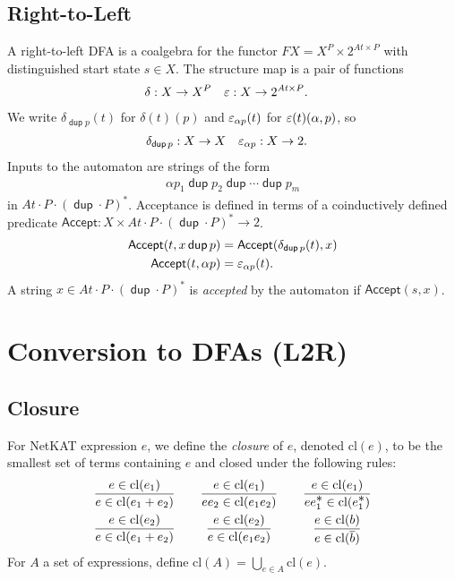 \documentclass{article}
\newcommand\At{\ensuremath{\mathit{At}}}
\newcommand\pdup{\mathop{\mathsf{dup}}}
\renewcommand\star{^{\textstyle *}}
\newcommand\acc{\mathsf{Accept}}
\newcommand\clname{\mathrm{cl}}
\newcommand\cl[1]{\clname(#1)}
\begin{document}
\subsection*{Right-to-Left}

A right-to-left DFA is a coalgebra for the functor $FX = X^{P}\times 2^{\At\times P}$ with distinguished start state $s\in X$. The structure map is a pair of functions
\begin{align*}
\delta &: X\to X^{P} & \eps &: X\to 2^{\At\times P}.
\end{align*}
We write $\delta_{\pdup p}(t)$ for $\delta(t)(p)$ and $\varepsilon_{\alpha p}(t)$ for $\varepsilon(t)(\alpha,p)$, so
\begin{align*}
\delta_{\pdup p} &: X\to X & \eps_{\alpha p} &: X\to 2.
\end{align*}
Inputs to the automaton are strings of the form
\begin{align*}
\alpha p_1\pdup p_2\pdup\cdots\pdup p_m
\end{align*}
in $\At\cdot P\cdot(\pdup\cdot P)\star$. Acceptance is defined in terms of a coinductively defined predicate $\acc:X\times\At\cdot P\cdot(\pdup\cdot P)\star\to 2$.
\begin{align*}
\acc(t,x\pdup p) &= \acc(\delta_{\pdup p}(t),x)\\
\acc(t,\alpha p) &= \eps_{\alpha p}(t).
\end{align*}
A string $x\in\At\cdot P\cdot(\pdup\cdot P)\star$ is \emph{accepted} by the automaton if $\acc(s,x)$.

\section*{Conversion to DFAs (L2R)}

\newcommand\repname{R}
\newcommand\repone[1]{\repname(#1)}
\newcommand\rep[2]{\repname(#2)(#1)}
\newcommand\pfun\rightharpoonup
\newcommand\arity[1]{\mathrm{arity}\,#1}

\subsection*{Closure}

For NetKAT expression $e$, we define the \emph{closure} of $e$, denoted $\cl e$, to be the smallest set
of terms containing $e$ and closed under the following rules:
\begin{equation}
\begin{array}{c@{\qquad}c@{\qquad}c}
\dfrac{e\in\cl{e_1}}{e\in\cl{e_1+e_2}} & \dfrac{e\in\cl{e_1}}{ee_2\in\cl{e_1e_2}} & \dfrac{e\in\cl{e_1}}{ee_1\star\in\cl{e_1\star}}\\[1em]
\dfrac{e\in\cl{e_2}}{e\in\cl{e_1+e_2}} & \dfrac{e\in\cl{e_2}}{e\in\cl{e_1e_2}} & \dfrac{e\in\cl{b}}{e\in\cl{\bar b}}
\end{array}
\label{eq:cldef}
\end{equation}
For $A$ a set of expressions, define $\cl A = \bigcup_{e\in A} \cl e$.
\end{document}
